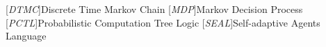
[\emph{DTMC}]{Discrete Time Markov Chain}
[\emph{MDP}]{Markov Decision Process}
[\emph{PCTL}]{Probabilistic Computation Tree Logic}
[\emph{SEAL}]{Self-adaptive Agents Language}

